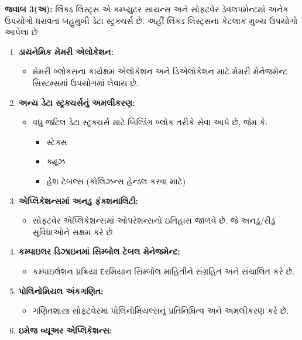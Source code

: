 \textbf{જવાબ 3(અ):} લિંક્ડ લિસ્ટ્સ એ કમ્પ્યુટર સાયન્સ અને સોફ્ટવેર ડેવલપમેન્ટમાં અનેક
ઉપયોગો ધરાવતા બહુમુખી ડેટા સ્ટ્રક્ચર્સ છે. અહીં લિંક્ડ લિસ્ટ્સના કેટલાક મુખ્ય ઉપયોગો
આપેલા છે:

\begin{enumerate}
\def\labelenumi{\arabic{enumi}.}
\tightlist
\item
  \textbf{ડાયનેમિક મેમરી એલોકેશન:}

  \begin{itemize}
  \tightlist
  \item
    મેમરી બ્લોક્સના કાર્યક્ષમ એલોકેશન અને ડિએલોકેશન માટે મેમરી મેનેજમેન્ટ સિસ્ટમ્સમાં
    ઉપયોગમાં લેવાય છે.
  \end{itemize}
\item
  \textbf{અન્ય ડેટા સ્ટ્રક્ચર્સનું અમલીકરણ:}

  \begin{itemize}
  \tightlist
  \item
    વધુ જટિલ ડેટા સ્ટ્રક્ચર્સ માટે બિલ્ડિંગ બ્લોક તરીકે સેવા આપે છે, જેમ કે:

    \begin{itemize}
    \tightlist
    \item
      સ્ટેક્સ
    \item
      ક્યૂઝ
    \item
      હેશ ટેબલ્સ (કોલિઝન્સ હેન્ડલ કરવા માટે)
    \end{itemize}
  \end{itemize}
\item
  \textbf{એપ્લિકેશન્સમાં અનડુ ફંક્શનાલિટી:}

  \begin{itemize}
  \tightlist
  \item
    સોફ્ટવેર એપ્લિકેશન્સમાં ઓપરેશન્સનો ઇતિહાસ જાળવે છે, જે અનડુ/રીડુ સુવિધાઓને સક્ષમ કરે
    છે.
  \end{itemize}
\item
  \textbf{કમ્પાઇલર ડિઝાઇનમાં સિમ્બોલ ટેબલ મેનેજમેન્ટ:}

  \begin{itemize}
  \tightlist
  \item
    કમ્પાઇલેશન પ્રક્રિયા દરમિયાન સિમ્બોલ માહિતીને સંગ્રહિત અને સંચાલિત કરે છે.
  \end{itemize}
\item
  \textbf{પોલિનોમિયલ અંકગણિત:}

  \begin{itemize}
  \tightlist
  \item
    ગણિતશાસ્ત્ર સોફ્ટવેરમાં પોલિનોમિયલ્સનું પ્રતિનિધિત્વ અને અમલીકરણ કરે છે.
  \end{itemize}
\item
  \textbf{ઇમેજ વ્યૂઅર એપ્લિકેશન્સ:}


\end{enumerate}
